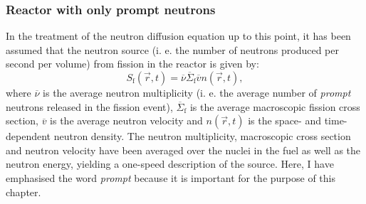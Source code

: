 \subsubsection{Reactor with only prompt neutrons}
\label{sec:prompt_neutrons}
In the treatment of the neutron diffusion equation up to this point, it has been assumed that the neutron source (i. e. the number of neutrons produced per second per volume) from fission in the reactor is given by:
\begin{equation}
	S_\text{f}(\vec{r}, t) = \overline{\nu} \overline{\Sigma}_\text{f}\overline{v}n(\vec{r}, t),
	\label{eq:prompt_source}
\end{equation}
where $\overline{\nu}$ is the average neutron multiplicity (i. e. the average number of \emph{prompt} neutrons released in the fission event), $\overline{\Sigma}_\text{f}$ is the average macroscopic fission cross section, $\overline{v}$ is the average neutron velocity and $n(\vec{r}, t)$ is the space- and time-dependent neutron density. The neutron multiplicity, macroscopic cross section and neutron velocity have been averaged over the nuclei in the fuel as well as the neutron energy, yielding a one-speed description of the source. Here, I have emphasised the word \emph{prompt} because it is important for the purpose of this chapter.

